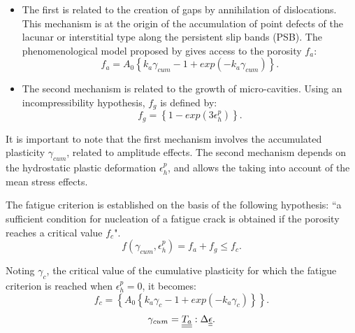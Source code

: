 \vspace{6pt}
\begin{itemize}
	\item  The first is related to the creation of gaps by annihilation of dislocations. This mechanism is at the origin of the accumulation of point defects of the lacunar or interstitial type along the persistent slip bands (PSB). The phenomenological model proposed by \cite{essmann1979annihilation} gives access to the porosity $f_a$:
	\begin{equation}
	f_a= A_0\left\lbrace k_a\gamma_{cum}-1+exp\left(-k_a\gamma_{cum} \right)  \right\rbrace .
	\label{eq.monchiet2}
	\end{equation}
	
	\item  The second mechanism is related to the growth of micro-cavities. Using an incompressibility hypothesis, $f_g$ is defined by:
	\begin{equation}
	f_g=\left\lbrace 1-exp\left(3\epsilon_h^p \right) \right\rbrace.
	\label{eq.monchiet3}
	\end{equation}
\end{itemize}

It is important to note that the first mechanism involves the accumulated plasticity $\gamma_{cum}$, related to amplitude effects. The second mechanism depends on the hydrostatic plastic deformation $\epsilon_h^p$, and allows the taking into account of the mean stress effects.

The fatigue criterion is established on the basis of the following hypothesis: ``a sufficient condition for nucleation of a fatigue crack is obtained if the porosity reaches a critical value $f_c$".
\begin{equation}
f\left( \gamma_{cum},\epsilon_h^p\right) =f_a+f_g\leqslant f_c.
\label{eq.monchiet4}
\end{equation}

Noting $\gamma_c$, the critical value of the cumulative plasticity for which the fatigue criterion is reached when $\epsilon_h^p=0$, it becomes:
\begin{equation}
f_c=\left\lbrace A_0\left\lbrace k_a\gamma_{c}-1+exp\left(-k_a\gamma_{c} \right)  \right\rbrace \right\rbrace.
\label{eq.monchiet5}
\end{equation}
\begin{equation}
\gamma_{cum}=\uline{\uline{T_a}}:\Delta\uline{\uline{\epsilon}}.
\label{eq.monchiet5.5}
\end{equation}

